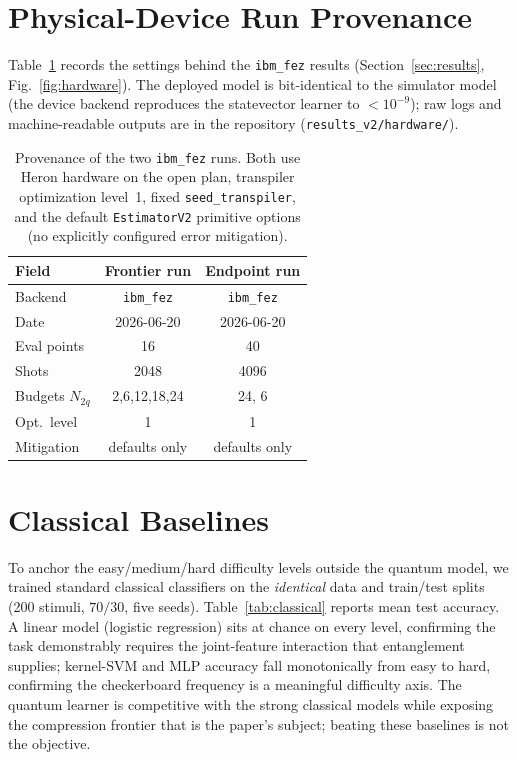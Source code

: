 \documentclass[conference]{IEEEtran}
\begin{document}
\appendices

\section{Physical-Device Run Provenance}
\label{app:hw}

Table~\ref{tab:hwmeta} records the settings behind the \texttt{ibm\_fez} results
(Section~\ref{sec:results}, Fig.~\ref{fig:hardware}). The deployed model is bit-identical
to the simulator model (the device backend reproduces the statevector learner to
$<10^{-9}$); raw logs and machine-readable outputs are in the repository
(\texttt{results\_v2/hardware/}).

\begin{table}[H]
\centering
\caption{Provenance of the two \texttt{ibm\_fez} runs. Both use Heron hardware on the open
plan, transpiler optimization level~1, fixed \texttt{seed\_transpiler}, and the default
\texttt{EstimatorV2} primitive options (no explicitly configured error mitigation).}
\label{tab:hwmeta}
\begin{tabular}{lcc}
\toprule
Field & Frontier run & Endpoint run \\
\midrule
Backend & \texttt{ibm\_fez} & \texttt{ibm\_fez} \\
Date & 2026-06-20 & 2026-06-20 \\
Eval points & 16 & 40 \\
Shots & 2048 & 4096 \\
Budgets $N_{2q}$ & 2,6,12,18,24 & 24, 6 \\
Opt.\ level & 1 & 1 \\
Mitigation & defaults only & defaults only \\
\bottomrule
\end{tabular}
\end{table}

\section{Classical Baselines}
\label{app:classical}

To anchor the easy/medium/hard difficulty levels outside the quantum model, we trained
standard classical classifiers on the \emph{identical} data and train/test splits (200
stimuli, $70/30$, five seeds). Table~\ref{tab:classical} reports mean test accuracy. A
linear model (logistic regression) sits at chance on every level, confirming the task
demonstrably requires the joint-feature interaction that entanglement supplies; kernel-SVM
and MLP accuracy fall monotonically from easy to hard, confirming the checkerboard
frequency is a meaningful difficulty axis. The quantum learner is competitive with the
strong classical models while exposing the compression frontier that is the paper's
subject; beating these baselines is not the objective.
\end{document}
